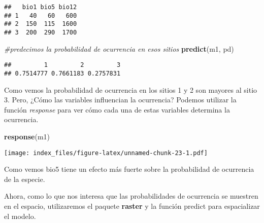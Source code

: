 \documentclass[]{article}
\newenvironment{Shaded}{\begin{snugshade}}{\end{snugshade}}
\newcommand{\KeywordTok}[1]{\textcolor[rgb]{0.13,0.29,0.53}{\textbf{{#1}}}}
\newcommand{\DataTypeTok}[1]{\textcolor[rgb]{0.13,0.29,0.53}{{#1}}}
\newcommand{\StringTok}[1]{\textcolor[rgb]{0.31,0.60,0.02}{{#1}}}
\newcommand{\CommentTok}[1]{\textcolor[rgb]{0.56,0.35,0.01}{\textit{{#1}}}}
\newcommand{\OtherTok}[1]{\textcolor[rgb]{0.56,0.35,0.01}{{#1}}}
\newcommand{\NormalTok}[1]{{#1}}
\begin{document}
\begin{verbatim}
##   bio1 bio5 bio12
## 1   40   60   600
## 2  150  115  1600
## 3  200  290  1700
\end{verbatim}

\begin{Shaded}
\begin{Highlighting}[]
\CommentTok{#predecimos la probabilidad de ocurrencia en esos sitios}
\KeywordTok{predict}\NormalTok{(m1, pd)}
\end{Highlighting}
\end{Shaded}

\begin{verbatim}
##         1         2         3 
## 0.7514777 0.7661183 0.2757831
\end{verbatim}

Como vemos la probabilidad de ocurrencia en los sitios 1 y 2 son mayores
al sitio 3. Pero, ¿Cómo las variables influencian la ocurrencia? Podemos
utilizar la función \emph{response} para ver cómo cada una de estas
variables determina la ocurrencia.

\begin{Shaded}
\begin{Highlighting}[]
\KeywordTok{response}\NormalTok{(m1)}
\end{Highlighting}
\end{Shaded}

\texttt{[image: index\_files/figure-latex/unnamed-chunk-23-1.pdf]}

Como vemos bio5 tiene un efecto más fuerte sobre la probabilidad de
ocurrencia de la especie.

Ahora, como lo que nos interesa que las probabilidades de ocurrencia se
muestren en el espacio, utilizaremos el paquete \textbf{raster} y la
función predict para espacializar el modelo.

\begin{Shaded}
\end{Shaded}
\end{document}
